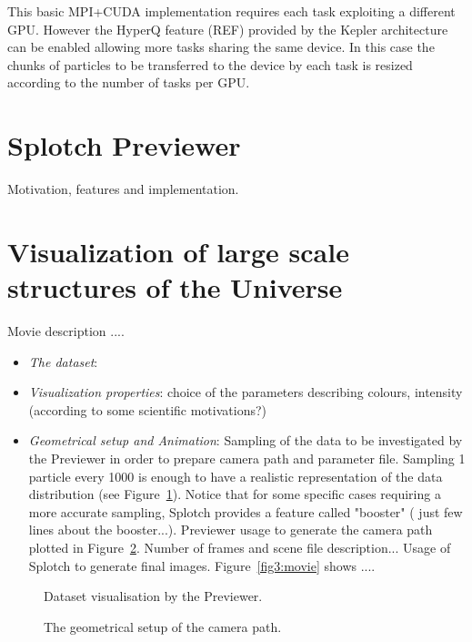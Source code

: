 \documentclass{egpubl}
\begin{document}
This basic MPI+CUDA implementation requires each task exploiting a different GPU. However the HyperQ  feature (REF) provided by the Kepler architecture can be enabled allowing more tasks sharing the same device. In this case the chunks of particles to be transferred to the device by each task is resized according to the number of tasks per GPU.
\section{Splotch Previewer}

Motivation, features and implementation.

\section{Visualization of large scale structures of the Universe}
Movie description ....

\begin{itemize}
\item \textit {The dataset}: 
\item \textit {Visualization properties}: choice of the parameters describing colours, intensity (according to some scientific motivations?)
\item \textit {Geometrical setup and Animation}:  Sampling of the data to be investigated by the Previewer in order to prepare camera path and parameter file. Sampling 1 particle every 1000 is enough to have a realistic representation of the data distribution (see Figure~\ref{fig1:preview}). 
Notice that for some specific cases requiring a more accurate sampling, Splotch provides a feature called "booster" ( just few lines about the booster...).
Previewer usage to generate the camera path plotted in Figure~\ref{fig2:camera}. Number of frames and scene file description...
Usage of Splotch to generate final images. Figure~\ref{fig3:movie} shows ....
\end{itemize}

\begin{figure}[htb]
   
   \caption{\label{fig1:preview}
   Dataset visualisation by the Previewer.}
\end{figure}

\begin{figure}[htb]
   
   \caption{\label{fig2:camera}
   The geometrical setup of the camera path.}
\end{figure}
\end{document}
